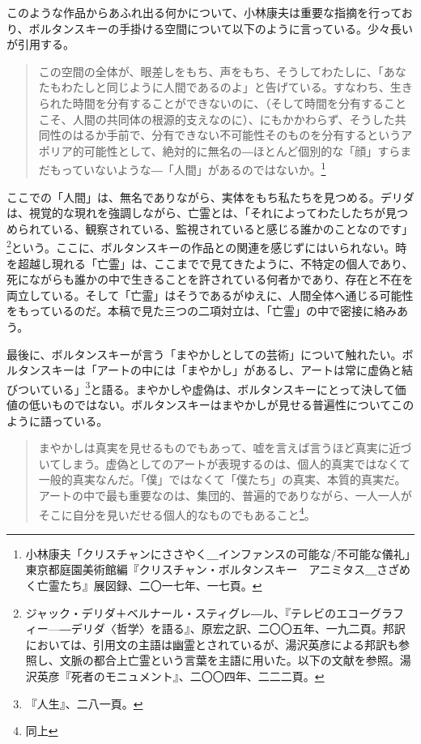 \documentclass[b5j,twoside,twocolumn]{utarticle}
\begin{document}
このような作品からあふれ出る何かについて、小林康夫は重要な指摘を行っており、ボルタンスキーの手掛ける空間について以下のように言っている。少々長いが引用する。

\begin{quote}
この空間の全体が、眼差しをもち、声をもち、そうしてわたしに、「あなたもわたしと同じように人間であるのよ」と告げている。すなわち、生きられた時間を分有することができないのに、（そして時間を分有することこそ、人間の共同体の根源的支えなのに）、にもかかわらず、そうした共同性のはるか手前で、分有できない不可能性そのものを分有するというアポリア的可能性として、絶対的に無名の―ほとんど個別的な「顔」すらまだもっていないような―「人間」があるのではないか。\footnote{小林康夫「クリスチャンにささやく＿インファンスの可能な/不可能な儀礼」東京都庭園美術館編『クリスチャン・ボルタンスキー　アニミタス＿さざめく亡霊たち』展図録、二〇一七年、一七頁。}

\end{quote}


ここでの「人間」は、無名でありながら、実体をもち私たちを見つめる。デリダは、視覚的な現れを強調しながら、亡霊とは、「それによってわたしたちが見つめられている、観察されている、監視されていると感じる誰かのことなのです」\footnote{ジャック・デリダ＋ベルナール・スティグレ―ル、『テレビのエコーグラフィー—―デリダ〈哲学〉を語る』、原宏之訳、二〇〇五年、一九二頁。邦訳においては、引用文の主語は幽霊とされているが、湯沢英彦による邦訳も参照し、文脈の都合上亡霊という言葉を主語に用いた。以下の文献を参照。湯沢英彦『死者のモニュメント』、二〇〇四年、二二二頁。}という。ここに、ボルタンスキーの作品との関連を感じずにはいられない。時を超越し現れる「亡霊」は、ここまでで見てきたように、不特定の個人であり、死にながらも誰かの中で生きることを許されている何者かであり、存在と不在を両立している。そして「亡霊」はそうであるがゆえに、人間全体へ通じる可能性をもっているのだ。本稿で見た三つの二項対立は、「亡霊」の中で密接に絡みあう。


最後に、ボルタンスキーが言う「まやかしとしての芸術」について触れたい。ボルタンスキーは「アートの中には「まやかし」があるし、アートは常に虚偽と結びついている」\footnote{『人生』、二八一頁。}と語る。まやかしや虚偽は、ボルタンスキーにとって決して価値の低いものではない。ボルタンスキーはまやかしが見せる普遍性についてこのように語っている。
\begin{quote}
まやかしは真実を見せるものでもあって、嘘を言えば言うほど真実に近づいてしまう。虚偽としてのアートが表現するのは、個人的真実ではなくて一般的真実なんだ。「僕」ではなくて「僕たち」の真実、本質的真実だ。アートの中で最も重要なのは、集団的、普遍的でありながら、一人一人がそこに自分を見いだせる個人的なものでもあること\footnote{同上}。
\end{quote}
\end{document}
